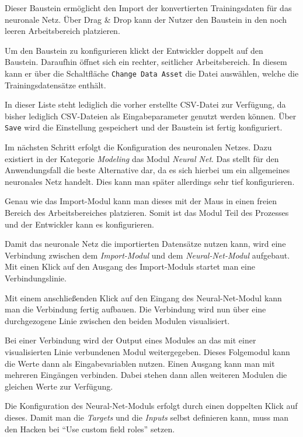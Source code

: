 Dieser Baustein ermöglicht den Import der konvertierten Trainingsdaten für das neuronale Netz. Über Drag \& Drop kann
der Nutzer den Baustein in den noch leeren Arbeitsbereich platzieren.

Um den Baustein zu konfigurieren klickt der Entwickler doppelt auf den Baustein. Daraufhin öffnet sich ein rechter,
seitlicher Arbeitsbereich. In diesem kann er über die Schaltfläche \texttt{Change Data Asset} die Datei auswählen,
welche die Trainingsdatensätze enthält.

In dieser Liste steht lediglich die vorher erstellte CSV-Datei zur Verfügung, da bisher lediglich CSV-Dateien als
Eingabeparameter genutzt werden können. Über \texttt{Save} wird die Einstellung gespeichert und der Baustein ist fertig
konfiguriert.

Im nächsten Schritt erfolgt die Konfiguration des neuronalen Netzes. Dazu existiert in der Kategorie \textit{Modeling}
das Modul \textit{Neural Net}. Das stellt für den Anwendungsfall die beste Alternative dar, da es sich hierbei um ein
allgemeines neuronales Netz handelt. Dies kann man später allerdings sehr tief konfigurieren.

Genau wie das Import-Modul kann man dieses mit der Maus in einen freien Bereich des Arbeitsbereiches platzieren. Somit
ist das Modul Teil des Prozesses und der Entwickler kann es konfigurieren.

Damit das neuronale Netz die importierten Datensätze nutzen kann, wird eine Verbindung zwischen dem
\textit{Import-Modul} und dem \textit{Neural-Net-Modul} aufgebaut. Mit einen Klick auf den Ausgang des Import-Moduls
startet man eine Verbindungslinie.

Mit einem anschließenden Klick auf den Eingang des Neural-Net-Modul kann man die Verbindung fertig aufbauen. Die
Verbindung wird nun über eine durchgezogene Linie zwischen den beiden Modulen visualisiert.

Bei einer Verbindung wird der Output eines Modules an das mit einer visualisierten Linie verbundenen Modul
weitergegeben. Dieses Folgemodul kann die Werte dann als Eingabevariablen nutzen. Einen Ausgang kann man mit mehreren
Eingängen verbinden. Dabei stehen dann allen weiteren Modulen die gleichen Werte zur Verfügung.

Die Konfiguration des Neural-Net-Moduls erfolgt durch einen doppelten Klick auf dieses. Damit man die
\textit{Targets} und die \textit{Inputs} selbst definieren kann, muss man den Hacken bei
\enquote{Use custom field roles} setzen.

